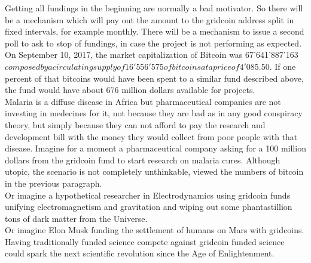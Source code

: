 Getting all fundings in the beginning are normally a bad motivator. So there will be a mechanism which will pay out the amount to the gridcoin address split in fixed intervals, for example monthly. There will be a mechanism to issue a second poll to ask to stop of fundings, in case the project is not performing as expected.\\

On September 10, 2017, the market capitalization of Bitcoin was 67'641'887'163 $ composed by a circulating supply of 16'556'575 of bitcoins at a price of 4'085.50 $. If one percent of that bitcoins would have been spent to a similar fund described above, the fund would have about 676 million dollars available for projects.\\

Malaria is a diffuse disease in Africa but pharmaceutical companies are not investing in medecines for it, not because they are bad as in any good conspiracy theory, but simply because they can not afford to pay the research and development bill with the money they would collect from poor people with that disease. Imagine for a moment a pharmaceutical company asking for a 100 million dollars from the gridcoin fund to start research on malaria cures. Although utopic, the scenario is not completely unthinkable, viewed the numbers of bitcoin in the previous paragraph.\\

Or imagine a hypothetical researcher in Electrodynamics using gridcoin funds unifying electromagnetism and gravitation and wiping out some phantastillion tons of dark matter from the Universe.\\

Or imagine Elon Musk funding the settlement of humans on Mars with gridcoins.\\

Having traditionally funded science compete against gridcoin funded science could spark the next scientific revolution since the Age of Enlightenment.\\

